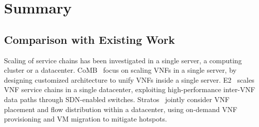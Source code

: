 \section{Summary}\label{sec:scalims-conclusion}

\subsection{Comparison with Existing Work}

Scaling of service chains has been investigated in a single server, a computing cluster or a datacenter. CoMB~\cite{sekar2012design} focus on scaling VNFs in a single server, %
 by designing customized architecture to unify VNFs inside a single server. %
 E2~\cite{palkar2015e2} scales VNF service chains in a single datacenter, %
 exploiting high-performance inter-VNF data paths through SDN-enabled switches. %
Stratos~\cite{gember2012stratos} %
 jointly consider VNF placement and flow distribution within a datacenter, using on-demand VNF provisioning and VM migration to mitigate hotspots.

